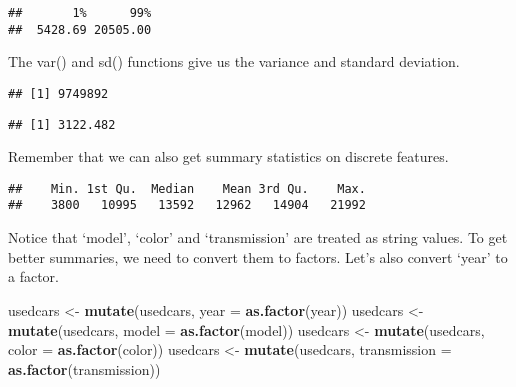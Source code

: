 \documentclass[]{article}
\newenvironment{Shaded}{\begin{snugshade}}{\end{snugshade}}
\newcommand{\DataTypeTok}[1]{\textcolor[rgb]{0.13,0.29,0.53}{#1}}
\newcommand{\KeywordTok}[1]{\textcolor[rgb]{0.13,0.29,0.53}{\textbf{#1}}}
\newcommand{\NormalTok}[1]{#1}
\newcommand{\OperatorTok}[1]{\textcolor[rgb]{0.81,0.36,0.00}{\textbf{#1}}}
\newcommand{\StringTok}[1]{\textcolor[rgb]{0.31,0.60,0.02}{#1}}
\begin{document}
\begin{verbatim}
##       1%      99% 
##  5428.69 20505.00
\end{verbatim}

The {var()} and {sd()} functions give us the variance and standard
deviation.

\begin{Shaded}
\end{Shaded}

\begin{verbatim}
## [1] 9749892
\end{verbatim}

\begin{Shaded}
\end{Shaded}

\begin{verbatim}
## [1] 3122.482
\end{verbatim}

Remember that we can also get summary statistics on discrete features.

\begin{Shaded}
\end{Shaded}

\begin{verbatim}
##    Min. 1st Qu.  Median    Mean 3rd Qu.    Max. 
##    3800   10995   13592   12962   14904   21992
\end{verbatim}

Notice that `model', `color' and `transmission' are treated as string
values. To get better summaries, we need to convert them to factors.
Let's also convert `year' to a factor.

\begin{Shaded}
\begin{Highlighting}[]
\NormalTok{usedcars <-}\StringTok{ }\KeywordTok{mutate}\NormalTok{(usedcars, }\DataTypeTok{year =} \KeywordTok{as.factor}\NormalTok{(year))}
\NormalTok{usedcars <-}\StringTok{ }\KeywordTok{mutate}\NormalTok{(usedcars, }\DataTypeTok{model =} \KeywordTok{as.factor}\NormalTok{(model))}
\NormalTok{usedcars <-}\StringTok{ }\KeywordTok{mutate}\NormalTok{(usedcars, }\DataTypeTok{color =} \KeywordTok{as.factor}\NormalTok{(color))}
\NormalTok{usedcars <-}\StringTok{ }\KeywordTok{mutate}\NormalTok{(usedcars, }\DataTypeTok{transmission =} \KeywordTok{as.factor}\NormalTok{(transmission))}
\end{Highlighting}
\end{Shaded}
\end{document}
